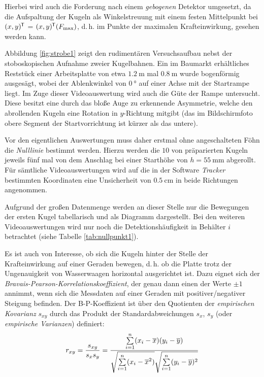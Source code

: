 Hierbei wird auch die Forderung nach einem \textit{gebogenen} Detektor umgesetzt, da die Aufspaltung der Kugeln als Winkelstreuung mit einem festen Mittelpunkt bei $(x, y)^{\mkern-1.5mu\mathsf{T}}$ = $(x, y)^{\mkern-1.5mu\mathsf{T}} (F_\mathrm{max})$, d.\,h. im Punkte der maximalen Krafteinwirkung, gesehen werden kann.



Abbildung \ref{fig:strobe1} zeigt den rudimentären Versuchsaufbau nebst der stoboskopischen Aufnahme zweier Kugelbahnen. Ein im Baumarkt erhältliches Reststück einer Arbeitsplatte von etwa $\SI{1.2}{\metre}$ mal $\SI{0.8}{\metre}$ wurde bogenförmig ausgesägt, wobei der Ablenkwinkel von $\SI{0}{\degree}$ auf einer Achse mit der Startrampe liegt. Im Zuge dieser Videoauswertung wird auch die Güte der Rampe untersucht. Diese besitzt eine durch das bloße Auge zu erkennende Asymmetrie, welche den abrollenden Kugeln eine Rotation in $y$-Richtung mitgibt (das im Bildschirmfoto obere Segment der Startvorrichtung ist kürzer als das untere).

Vor den eigentlichen Auswertungen muss daher erstmal ohne angeschalteten Föhn die \textit{Nulllinie} bestimmt werden. Hierzu werden die $10$ von \textcite[S.\,34]{Mais2014} präparierten Kugeln jeweils fünf mal von dem Anschlag bei einer Starthöhe von $h=\SI{55}{\milli\metre}$ abgerollt. Für sämtliche Videoauswertungen wird auf die in der Software \textit{Tracker} bestimmten Koordinaten eine Unsicherheit von $\SI{0.5}{\centi\metre}$ in beide Richtungen angenommen.

Aufgrund der großen Datenmenge werden an dieser Stelle nur die Bewegungen der ersten Kugel tabellarisch und als Diagramm dargestellt. Bei den weiteren Videoauswertungen wird nur noch die Detektionshäufigkeit in Behälter $i$ betrachtet (siehe Tabelle \ref{tab:nullpunkt1}). 

Es ist auch von Interesse, ob sich die Kugeln hinter der Stelle der Krafteinwirkung auf einer Geraden bewegen, d.\,h. ob die Platte trotz der Ungenauigkeit von Wasserwaagen horizontal ausgerichtet ist. Dazu eignet sich der \textit{Bravais-Pearson-Korrelationskoeffizient}, der genau dann einen der Werte $\pm 1$ annimmt, wenn sich die Messdaten auf einer Geraden mit positiver/negativer Steigung befinden. Der B-P-Koeffizient ist über den Quotienten der \textit{empirischen Kovarianz} $s_{xy}$ durch das Produkt der Standardabweichungen $s_x$, $s_y$ (oder \textit{empirische Varianzen}) definiert:
\begin{equation}
\label{eq:b-p-k}
r_{xy}=\frac{s_{xy}}{s_xs_y}=\frac{\sum\limits_{i=1}^{n}(x_i-\overline{x})(y_i-\overline{y})}{\sqrt{\sum\limits_{i=1}^{n}(x_i-\overline{x}^2)}\sqrt{\sum\limits_{i=1}^{n}(y_i-\overline{y})^2}}\\
\end{equation}

